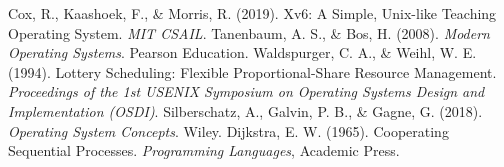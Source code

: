\documentclass[12pt]{article}
\begin{document}
\begin{thebibliography}{9}
Cox, R., Kaashoek, F., \& Morris, R. (2019). Xv6: A Simple, Unix-like Teaching Operating System. \textit{MIT CSAIL}.
Tanenbaum, A. S., \& Bos, H. (2008). \textit{Modern Operating Systems}. Pearson Education.
Waldspurger, C. A., \& Weihl, W. E. (1994). Lottery Scheduling: Flexible Proportional-Share Resource Management. \textit{Proceedings of the 1st USENIX Symposium on Operating Systems Design and Implementation (OSDI)}.
Silberschatz, A., Galvin, P. B., \& Gagne, G. (2018). \textit{Operating System Concepts}. Wiley.
Dijkstra, E. W. (1965). Cooperating Sequential Processes. \textit{Programming Languages}, Academic Press.
\end{thebibliography}
\end{document}
